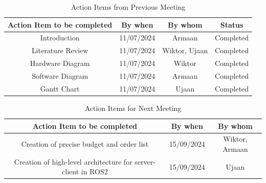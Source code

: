 \documentclass{article}
\begin{document}
\begin{table}[h]
    \centering
    \begin{tabular}{|c|c|c|c|}
        \hline
        \textbf{Action Item to be completed} & \textbf{By when} & \textbf{By whom} & \textbf{Status} \\
        \hline
        Introduction & 11/07/2024 & Armaan  & Completed\\
        \hline
        Literature Review  & 11/07/2024 & Wiktor, Ujaan & Completed\\
        \hline
        Hardware Diagram & 11/07/2024 & Wiktor  & Completed\\
        \hline
        Software Diagram  & 11/07/2024 & Armaan & Completed\\
        \hline
        Gantt Chart  & 11/07/2024 & Ujaan & Completed\\
        \hline
    \end{tabular}
    \caption{Action Items from Previous Meeting}
    \label{tab:action_items_previous}
\end{table}

\begin{table}[h]
    \centering
    \begin{tabular}{|c|c|c|}
        \hline
        \textbf{Action Item to be completed} & \textbf{By when} & \textbf{By whom} \\
        \hline
        Creation of precise budget and order list & 15/09/2024 & Wiktor, Armaan \\
        \hline
        Creation of high-level architecture for server-client in ROS2 & 15/09/2024 & Ujaan\\
        \hline
    \end{tabular}
    \caption{Action Items for Next Meeting}
    \label{tab:action_items_next}
\end{table}

\end{document}

